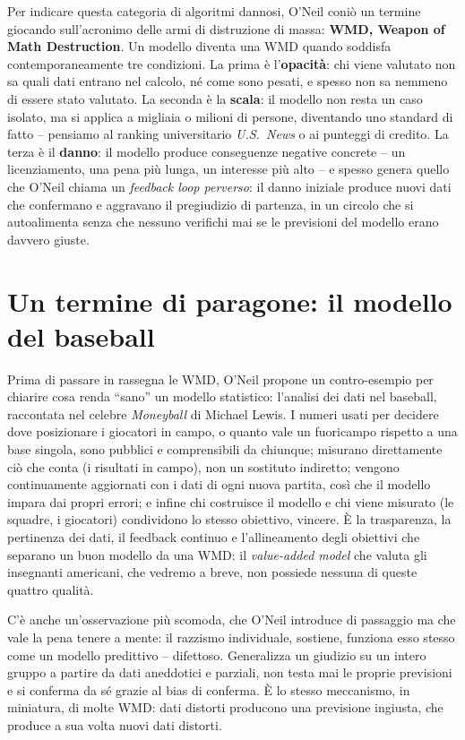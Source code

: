 \documentclass[a4paper,11pt]{article}
\begin{document}
Per indicare questa categoria di algoritmi dannosi, O'Neil coniò un termine giocando sull'acronimo delle armi di distruzione di massa: \textbf{WMD, Weapon of Math Destruction}. Un modello diventa una WMD quando soddisfa contemporaneamente tre condizioni. La prima è l'\textbf{opacità}: chi viene valutato non sa quali dati entrano nel calcolo, né come sono pesati, e spesso non sa nemmeno di essere stato valutato. La seconda è la \textbf{scala}: il modello non resta un caso isolato, ma si applica a migliaia o milioni di persone, diventando uno standard di fatto -- pensiamo al ranking universitario \emph{U.S.\ News} o ai punteggi di credito. La terza è il \textbf{danno}: il modello produce conseguenze negative concrete -- un licenziamento, una pena più lunga, un interesse più alto -- e spesso genera quello che O'Neil chiama un \emph{feedback loop perverso}: il danno iniziale produce nuovi dati che confermano e aggravano il pregiudizio di partenza, in un circolo che si autoalimenta senza che nessuno verifichi mai se le previsioni del modello erano davvero giuste.

\section{Un termine di paragone: il modello del baseball}

Prima di passare in rassegna le WMD, O'Neil propone un contro-esempio per chiarire cosa renda ``sano'' un modello statistico: l'analisi dei dati nel baseball, raccontata nel celebre \emph{Moneyball} di Michael Lewis. I numeri usati per decidere dove posizionare i giocatori in campo, o quanto vale un fuoricampo rispetto a una base singola, sono pubblici e comprensibili da chiunque; misurano direttamente ciò che conta (i risultati in campo), non un sostituto indiretto; vengono continuamente aggiornati con i dati di ogni nuova partita, così che il modello impara dai propri errori; e infine chi costruisce il modello e chi viene misurato (le squadre, i giocatori) condividono lo stesso obiettivo, vincere. È la trasparenza, la pertinenza dei dati, il feedback continuo e l'allineamento degli obiettivi che separano un buon modello da una WMD: il \emph{value-added model} che valuta gli insegnanti americani, che vedremo a breve, non possiede nessuna di queste quattro qualità.

C'è anche un'osservazione più scomoda, che O'Neil introduce di passaggio ma che vale la pena tenere a mente: il razzismo individuale, sostiene, funziona esso stesso come un modello predittivo -- difettoso. Generalizza un giudizio su un intero gruppo a partire da dati aneddotici e parziali, non testa mai le proprie previsioni e si conferma da sé grazie al bias di conferma. È lo stesso meccanismo, in miniatura, di molte WMD: dati distorti producono una previsione ingiusta, che produce a sua volta nuovi dati distorti.
\end{document}
